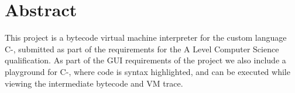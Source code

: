 \begingroup
\let\clearpage\relax
\let\cleardoublepage\relax
\let\cleardoublepage\relax

\chapter*{Abstract}
This project is a bytecode virtual machine interpreter for the custom language C-, submitted as part of the requirements for the A Level Computer Science qualification. As part of the GUI requirements of the project we also include a playground for C-, where code is syntax highlighted, and can be executed while viewing the intermediate bytecode and \ac{VM} trace.
\endgroup			

\vfill